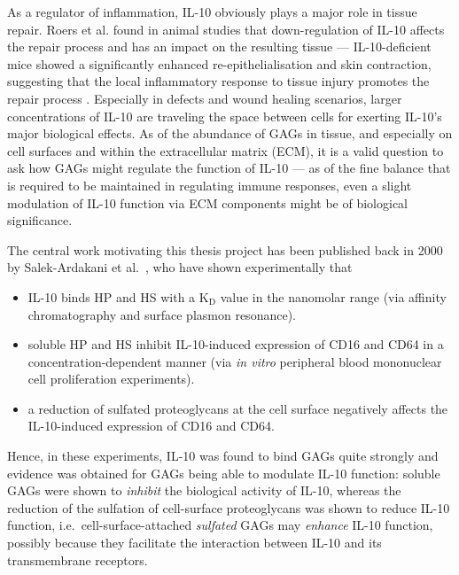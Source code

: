 As a regulator of inflammation, IL-10 obviously plays a major role in tissue
repair. Roers et al. found in animal studies that down-regulation of IL-10
affects the repair process and has an impact on the resulting tissue ---
IL-10-deficient mice showed a significantly enhanced re-epithelialisation and
skin contraction, suggesting that the local inflammatory response to tissue
injury promotes the repair process \cite{roers_il10mice_woundhealing_2007}.
Especially in defects and wound healing scenarios, larger concentrations of
IL-10 are traveling the space between cells for exerting IL-10's major
biological effects. As of the abundance of GAGs in tissue, and especially on
cell surfaces and within the extracellular matrix (ECM), it is a valid question
to ask how GAGs might regulate the function of IL-10 --- as of the fine balance
that is required to be maintained in regulating immune responses, even a slight
modulation of IL-10 function via ECM components might be of biological
significance.

The central work motivating this thesis project has been published back in 2000
by Salek-Ardakani et al.\ \cite{salek_ardakani_2000}, who have shown
experimentally that

\begin{itemize}
\item IL-10 binds HP and HS with a $\mathrm{K}_\mathrm{D}$
value in the nanomolar range (via affinity chromatography and surface plasmon
resonance).
\item soluble HP and HS inhibit IL-10-induced expression of CD16 and CD64 in a
concentration-dependent manner (via \textit{in vitro} peripheral blood
mononuclear cell proliferation experiments).
\item a reduction of sulfated proteoglycans at the cell surface negatively
affects the IL-10-induced expression of CD16 and CD64.
\end{itemize}

Hence, in these experiments, IL-10 was found to bind GAGs quite strongly and
evidence was obtained for GAGs being able to modulate IL-10 function: soluble
GAGs were shown to \textit{inhibit} the biological activity of IL-10, whereas
the reduction of the sulfation of cell-surface proteoglycans was shown to reduce
IL-10 function, i.e.\ cell-surface-attached \textit{sulfated} GAGs may
\textit{enhance} IL-10 function, possibly because they facilitate the
interaction between IL-10 and its transmembrane receptors.

